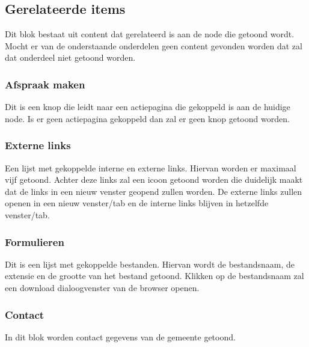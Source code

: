 \subsection{Gerelateerde items}
\label{sec:gerelateerdeitems}
Dit blok bestaat uit content dat gerelateerd is aan de node die getoond wordt. Mocht er van de onderstaande onderdelen geen content gevonden worden dat zal dat onderdeel niet getoond worden.

\subsubsection{Afspraak maken}
\label{sec:afspraakmaken}
Dit is een knop die leidt naar een actiepagina die gekoppeld is aan de huidige node. Is er geen actiepagina gekoppeld dan zal er geen knop getoond worden.

\subsubsection{Externe links}
\label{sec:externelinks}
Een lijst met gekoppelde interne en externe links. Hiervan worden er maximaal vijf getoond. Achter deze links zal een icoon getoond worden die duidelijk maakt dat de links in een nieuw venster geopend zullen worden. De externe links zullen openen in een nieuw venster/tab en de interne links blijven in hetzelfde venster/tab.

\subsubsection{Formulieren}
\label{sec:formulieren}
Dit is een lijst met gekoppelde bestanden. Hiervan wordt de bestandsnaam, de extensie en de grootte van het bestand getoond. Klikken op de bestandsnaam zal een download dialoogvenster van de browser openen.

\subsubsection{Contact}
\label{sec:contact}
In dit blok worden contact gegevens van de gemeente getoond.